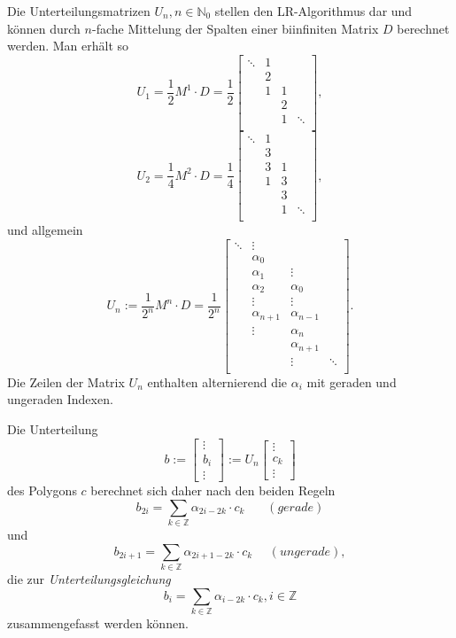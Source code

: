 Die Unterteilungsmatrizen \(U_n, n \in \mathbb{N}_0\) stellen den LR-Algorithmus dar und können durch \(n\)-fache Mittelung der Spalten einer biinfiniten Matrix \(D\) berechnet werden. Man erhält so
\[U_1 = \frac{1}{2} M^1 \cdot D = \frac{1}{2}
\begin{bmatrix}
	\ddots 	& 1 			& 				& 			\\
			& 2 			& 				& 			\\
			& 1 			& 1 			& 			\\
			& 				& 2 			& 			\\
			& 				& 1 			& \ddots 	\\
\end{bmatrix},
\]
\[U_2 = \frac{1}{4}M^2\cdot D = \frac{1}{4}
\begin{bmatrix}
	\ddots 	& 1 			& 				&			\\
			& 3 			& 				&			\\
			& 3 			& 1 			&			\\
			& 1 			& 3 			&			\\
			& 				& 3 			&			\\
			& 				& 1 			& \ddots 	\\
\end{bmatrix},
\]
und allgemein
\[U_n := \frac{1}{2^n}M^n\cdot D = \frac{1}{2^n}
\begin{bmatrix}
	\ddots 	& \vdots 		&				&			\\
			& \alpha_0		&				&			\\
			& \alpha_1		& \vdots		&			\\
			& \alpha_2		& \alpha_0		&			\\
			& \vdots		& \vdots		&			\\
			& \alpha_{n+1}	& \alpha_{n-1} 	&			\\
			& \vdots		& \alpha_n		&			\\
			&				& \alpha_{n+1}	&			\\
			&				& \vdots		& \ddots 	\\
\end{bmatrix}.\]
Die Zeilen der Matrix \(U_n\) enthalten alternierend die \(\alpha_i\) mit geraden und ungeraden Indexen.

Die Unterteilung
\[b:= \begin{bmatrix} \vdots \\ b_i \\ \vdots \end{bmatrix} := U_n \begin{bmatrix} \vdots \\ c_k \\ \vdots \end{bmatrix}\]
des Polygons \(c\) berechnet sich daher nach den beiden Regeln
\[b_{2i} = \sum_{k\in \mathbb{Z}} \alpha_{2i-2k}\cdot c_k~~~~~~~~(gerade)\]
und
\[b_{2i+1} = \sum_{k\in \mathbb{Z}} \alpha_{2i+1-2k}\cdot c_k~~~~~~(ungerade),\]
die zur \textit{Unterteilungsgleichung}
\[b_i = \sum_{k\in \mathbb{Z}} \alpha_{i-2k}\cdot c_k, i \in \mathbb{Z}\]
zusammengefasst werden können.


